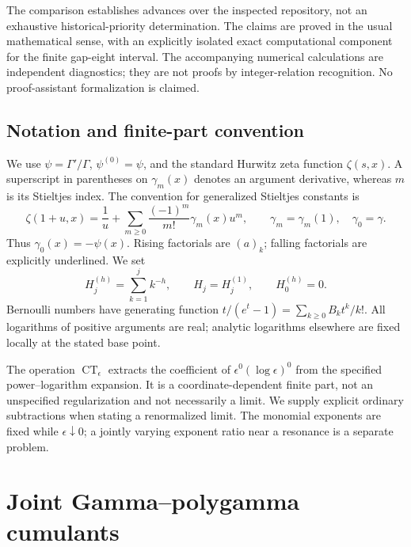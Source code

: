 \documentclass[11pt,a4paper]{article}
\numberwithin{equation}{section}
\theoremstyle{definition}
\theoremstyle{remark}
\begin{document}
The comparison establishes advances over the inspected repository,
not an exhaustive historical-priority determination. The claims are
proved in the usual mathematical sense, with an explicitly isolated
exact computational component for the finite gap-eight interval.
The accompanying numerical calculations are independent diagnostics;
they are not proofs by integer-relation recognition. No proof-assistant
formalization is claimed.

\subsection{Notation and finite-part convention}

We use $\psi=\Gamma'/\Gamma$, $\psi^{(0)}=\psi$, and the standard
Hurwitz zeta function $\zeta(s,x)$. A superscript in parentheses on
$\gamma_m(x)$ denotes an argument derivative, whereas $m$ is its
Stieltjes index. The convention for generalized Stieltjes constants is
\[
 \zeta(1+u,x)=\frac1u+
       \sum_{m\ge0}\frac{(-1)^m}{m!}\gamma_m(x)u^m,
 \qquad \gamma_m=\gamma_m(1),\quad\gamma_0=\gamma.
\]
Thus $\gamma_0(x)=-\psi(x)$. Rising factorials are $(a)_k$;
falling factorials are explicitly underlined. We set
\[
 H_j^{(h)}=\sum_{k=1}^j k^{-h},\qquad H_j=H_j^{(1)},
 \qquad H_0^{(h)}=0.
\]
Bernoulli numbers have generating function
$t/(e^t-1)=\sum_{k\ge0}B_k t^k/k!$.
All logarithms of positive arguments are real; analytic logarithms
elsewhere are fixed locally at the stated base point.

The operation $\operatorname{CT}_{\epsilon}$ extracts the coefficient
of $\epsilon^0(\log\epsilon)^0$ from the specified power--logarithm
expansion. It is a coordinate-dependent finite part, not an unspecified
regularization and not necessarily a limit. We supply explicit ordinary
subtractions when stating a renormalized limit. The monomial exponents
are fixed while $\epsilon\downarrow0$; a jointly varying exponent ratio
near a resonance is a separate problem.


\section{Joint Gamma--polygamma cumulants}
\label{gc:section}
\end{document}

